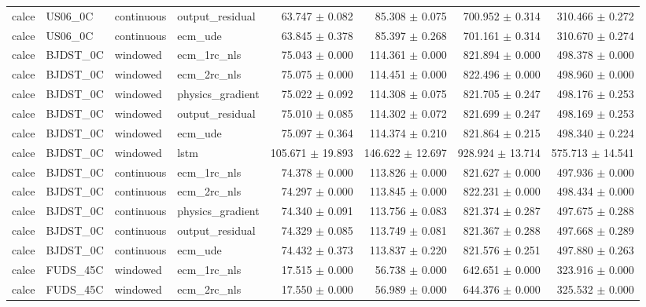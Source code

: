 \begin{longtable}{llllrrrr}
calce & US06\_0C & continuous & output\_residual & 63.747 $\pm$ 0.082 & 85.308 $\pm$ 0.075 & 700.952 $\pm$ 0.314 & 310.466 $\pm$ 0.272 \\
calce & US06\_0C & continuous & ecm\_ude & 63.845 $\pm$ 0.378 & 85.397 $\pm$ 0.268 & 701.161 $\pm$ 0.314 & 310.670 $\pm$ 0.274 \\
calce & BJDST\_0C & windowed & ecm\_1rc\_nls & 75.043 $\pm$ 0.000 & 114.361 $\pm$ 0.000 & 821.894 $\pm$ 0.000 & 498.378 $\pm$ 0.000 \\
calce & BJDST\_0C & windowed & ecm\_2rc\_nls & 75.075 $\pm$ 0.000 & 114.451 $\pm$ 0.000 & 822.496 $\pm$ 0.000 & 498.960 $\pm$ 0.000 \\
calce & BJDST\_0C & windowed & physics\_gradient & 75.022 $\pm$ 0.092 & 114.308 $\pm$ 0.075 & 821.705 $\pm$ 0.247 & 498.176 $\pm$ 0.253 \\
calce & BJDST\_0C & windowed & output\_residual & 75.010 $\pm$ 0.085 & 114.302 $\pm$ 0.072 & 821.699 $\pm$ 0.247 & 498.169 $\pm$ 0.253 \\
calce & BJDST\_0C & windowed & ecm\_ude & 75.097 $\pm$ 0.364 & 114.374 $\pm$ 0.210 & 821.864 $\pm$ 0.215 & 498.340 $\pm$ 0.224 \\
calce & BJDST\_0C & windowed & lstm & 105.671 $\pm$ 19.893 & 146.622 $\pm$ 12.697 & 928.924 $\pm$ 13.714 & 575.713 $\pm$ 14.541 \\
calce & BJDST\_0C & continuous & ecm\_1rc\_nls & 74.378 $\pm$ 0.000 & 113.826 $\pm$ 0.000 & 821.627 $\pm$ 0.000 & 497.936 $\pm$ 0.000 \\
calce & BJDST\_0C & continuous & ecm\_2rc\_nls & 74.297 $\pm$ 0.000 & 113.845 $\pm$ 0.000 & 822.231 $\pm$ 0.000 & 498.434 $\pm$ 0.000 \\
calce & BJDST\_0C & continuous & physics\_gradient & 74.340 $\pm$ 0.091 & 113.756 $\pm$ 0.083 & 821.374 $\pm$ 0.287 & 497.675 $\pm$ 0.288 \\
calce & BJDST\_0C & continuous & output\_residual & 74.329 $\pm$ 0.085 & 113.749 $\pm$ 0.081 & 821.367 $\pm$ 0.288 & 497.668 $\pm$ 0.289 \\
calce & BJDST\_0C & continuous & ecm\_ude & 74.432 $\pm$ 0.373 & 113.837 $\pm$ 0.220 & 821.576 $\pm$ 0.251 & 497.880 $\pm$ 0.263 \\
calce & FUDS\_45C & windowed & ecm\_1rc\_nls & 17.515 $\pm$ 0.000 & 56.738 $\pm$ 0.000 & 642.651 $\pm$ 0.000 & 323.916 $\pm$ 0.000 \\
calce & FUDS\_45C & windowed & ecm\_2rc\_nls & 17.550 $\pm$ 0.000 & 56.989 $\pm$ 0.000 & 644.376 $\pm$ 0.000 & 325.532 $\pm$ 0.000 \\

\end{longtable}
